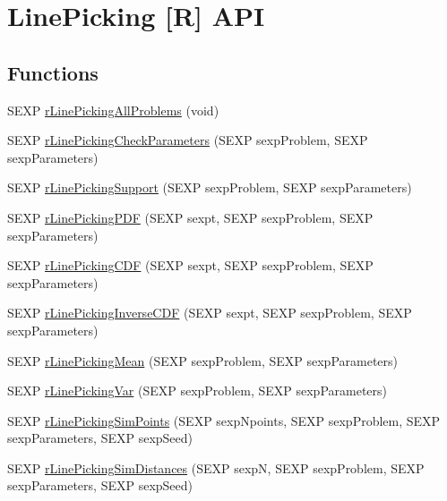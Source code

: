 \hypertarget{group__rapi}{\section{Line\-Picking \mbox{[}R\mbox{]} A\-P\-I}
\label{group__rapi}
}
\subsection*{Functions}
\begin{DoxyCompactItemize}
\item 
S\-E\-X\-P \hyperlink{group__rapi_ga02145a395d24bbe929ffa57688c72ef5}{r\-Line\-Picking\-All\-Problems} (void)
\item 
S\-E\-X\-P \hyperlink{group__rapi_ga9b3ba58aca598b6ee8f7239e87f3076c}{r\-Line\-Picking\-Check\-Parameters} (S\-E\-X\-P sexp\-Problem, S\-E\-X\-P sexp\-Parameters)
\item 
S\-E\-X\-P \hyperlink{group__rapi_ga6b30fc1bdbca2a3cc7f5340f1d8b44d5}{r\-Line\-Picking\-Support} (S\-E\-X\-P sexp\-Problem, S\-E\-X\-P sexp\-Parameters)
\item 
S\-E\-X\-P \hyperlink{group__rapi_gafe4502dd2e61ac946bfe6543fb38dd39}{r\-Line\-Picking\-P\-D\-F} (S\-E\-X\-P sexpt, S\-E\-X\-P sexp\-Problem, S\-E\-X\-P sexp\-Parameters)
\item 
S\-E\-X\-P \hyperlink{group__rapi_gac85aaf9284a29359e0d534ac1641b3f2}{r\-Line\-Picking\-C\-D\-F} (S\-E\-X\-P sexpt, S\-E\-X\-P sexp\-Problem, S\-E\-X\-P sexp\-Parameters)
\item 
S\-E\-X\-P \hyperlink{group__rapi_ga853c8dab80e2bdd284dba4f5e957811a}{r\-Line\-Picking\-Inverse\-C\-D\-F} (S\-E\-X\-P sexpt, S\-E\-X\-P sexp\-Problem, S\-E\-X\-P sexp\-Parameters)
\item 
S\-E\-X\-P \hyperlink{group__rapi_ga4316d34063551a4121f4cc0b7959b166}{r\-Line\-Picking\-Mean} (S\-E\-X\-P sexp\-Problem, S\-E\-X\-P sexp\-Parameters)
\item 
S\-E\-X\-P \hyperlink{group__rapi_gac2d2e36336e7c32427a9e99ccc67d18e}{r\-Line\-Picking\-Var} (S\-E\-X\-P sexp\-Problem, S\-E\-X\-P sexp\-Parameters)
\item 
S\-E\-X\-P \hyperlink{group__rapi_gacf32b79fce86f86cedc7843775e163c3}{r\-Line\-Picking\-Sim\-Points} (S\-E\-X\-P sexp\-Npoints, S\-E\-X\-P sexp\-Problem, S\-E\-X\-P sexp\-Parameters, S\-E\-X\-P sexp\-Seed)
\item 
S\-E\-X\-P \hyperlink{group__rapi_ga1d8792844b8fb2bfe583d80d7580938d}{r\-Line\-Picking\-Sim\-Distances} (S\-E\-X\-P sexp\-N, S\-E\-X\-P sexp\-Problem, S\-E\-X\-P sexp\-Parameters, S\-E\-X\-P sexp\-Seed)
\end{DoxyCompactItemize}


